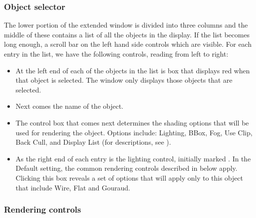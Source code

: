 \subsubsection{Object selector}

The lower portion of the extended \viewer{} window is divided into three
columns and the middle of these contains a list of all the objects in the
display.  If the list becomes long enough, a scroll bar on the left
hand side controls which are visible.  For each entry in the list, we have
the following controls, reading from left to right:

\begin{itemize}
  \item At the left end of each of the
        objects in the list is box that displays red when that object is
        selected.  The \viewer{} window only displays those objects that
        are selected.
  \item Next comes the name of the object.
  \item The  control box that comes next determines the
        shading options that will be used for rendering the object.
        Options include: Lighting, BBox, Fog, Use Clip, Back Cull, and
        Display List (for descriptions, see
        ).
  \item As the right end of each entry is the lighting control, initially
        marked .  In the Default setting, the common
        rendering controls described in  below apply.  Clicking this box
        reveals a set of options that will apply only to this object that
        include Wire, Flat and Gouraud.
\end{itemize}


\subsubsection{Rendering controls}
\label{sec:view-rendering} 

